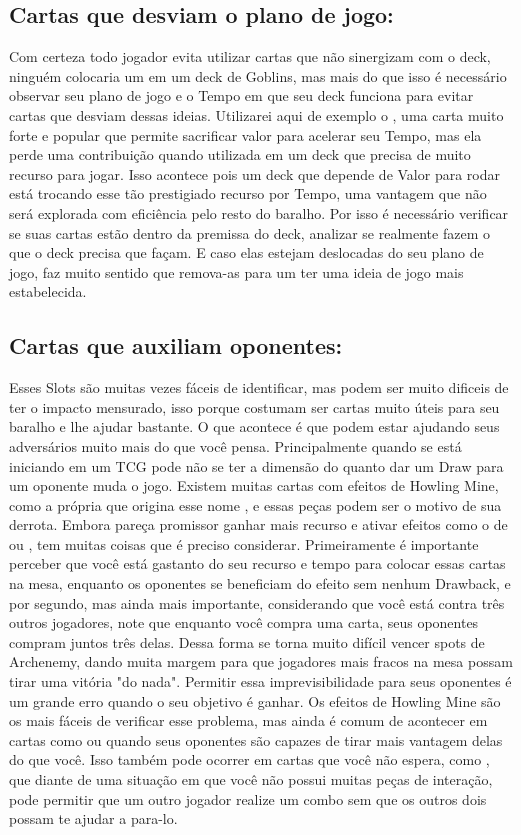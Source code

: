 \subsection{Cartas que desviam o plano de jogo:}
Com certeza todo jogador evita utilizar cartas que não sinergizam com o deck, ninguém colocaria um  em um deck de Goblins, mas mais do que isso é necessário observar seu plano de jogo e o Tempo em que seu deck funciona para evitar cartas que desviam dessas ideias.
Utilizarei aqui de exemplo o , uma carta muito forte e popular que permite sacrificar valor para acelerar seu Tempo, mas ela perde uma contribuição quando utilizada em um deck que precisa de muito recurso para jogar.
Isso acontece pois um deck que depende de Valor para rodar está trocando esse tão prestigiado recurso por Tempo, uma vantagem que não será explorada com eficiência pelo resto do baralho. Por isso é necessário verificar se suas cartas estão dentro da premissa do deck, analizar se realmente fazem o que o deck precisa que façam.
E caso elas estejam deslocadas do seu plano de jogo, faz muito sentido que remova-as para um ter uma ideia de jogo mais estabelecida.


\subsection{Cartas que auxiliam oponentes:}
Esses Slots são muitas vezes fáceis de identificar, mas podem ser muito dificeis de ter o impacto mensurado, isso porque costumam ser cartas muito úteis para seu baralho e lhe ajudar bastante.
O que acontece é que podem estar ajudando seus adversários muito mais do que você pensa. Principalmente quando se está iniciando em um TCG pode não se ter a dimensão do quanto dar um Draw para um oponente muda o jogo.
Existem muitas cartas com efeitos de Howling Mine, como a própria que origina esse nome , e essas peças podem ser o motivo de sua derrota. Embora pareça promissor ganhar mais recurso e ativar efeitos como o de  ou , tem muitas coisas que é preciso considerar.
Primeiramente é importante perceber que você está gastanto do seu recurso e tempo para colocar essas cartas na mesa, enquanto os oponentes se beneficiam do efeito sem nenhum Drawback, e por segundo, mas ainda mais importante, considerando que você está contra três outros jogadores, note que enquanto você compra uma carta, seus oponentes compram juntos três delas.
Dessa forma se torna muito difícil vencer spots de Archenemy, dando muita margem para que jogadores mais fracos na mesa possam tirar uma vitória "do nada". Permitir essa imprevisibilidade para seus oponentes é um grande erro quando o seu objetivo é ganhar.
Os efeitos de Howling Mine são os mais fáceis de verificar esse problema, mas ainda é comum de acontecer em cartas como  ou  quando seus oponentes são capazes de tirar mais vantagem delas do que você.
Isso também pode ocorrer em cartas que você não espera, como , que diante de uma situação em que você não possui muitas peças de interação, pode permitir que um outro jogador realize um combo sem que os outros dois possam te ajudar a para-lo.


